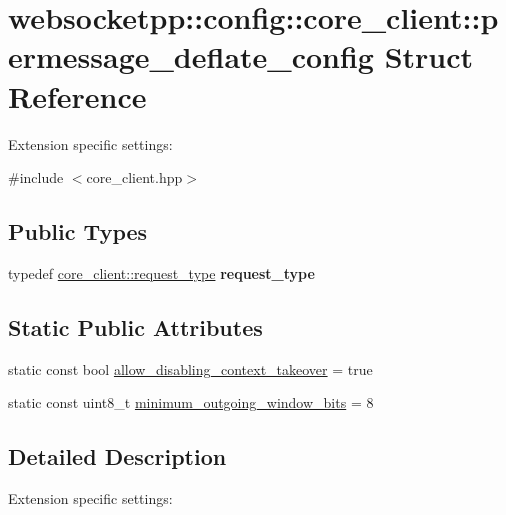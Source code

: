 \hypertarget{structwebsocketpp_1_1config_1_1core__client_1_1permessage__deflate__config}{}\section{websocketpp\+:\+:config\+:\+:core\+\_\+client\+:\+:permessage\+\_\+deflate\+\_\+config Struct Reference}
\label{structwebsocketpp_1_1config_1_1core__client_1_1permessage__deflate__config}


Extension specific settings\+:  




{\ttfamily \#include $<$core\+\_\+client.\+hpp$>$}

\subsection*{Public Types}
\begin{DoxyCompactItemize}
\item 
typedef \hyperlink{classwebsocketpp_1_1http_1_1parser_1_1request}{core\+\_\+client\+::request\+\_\+type} {\bfseries request\+\_\+type}\hypertarget{structwebsocketpp_1_1config_1_1core__client_1_1permessage__deflate__config_ad232507a23e7a2c6c70ae631dc87b80d}{}\label{structwebsocketpp_1_1config_1_1core__client_1_1permessage__deflate__config_ad232507a23e7a2c6c70ae631dc87b80d}

\end{DoxyCompactItemize}
\subsection*{Static Public Attributes}
\begin{DoxyCompactItemize}
\item 
static const bool \hyperlink{structwebsocketpp_1_1config_1_1core__client_1_1permessage__deflate__config_ab7cbd54d076521a3edf75bb44144d676}{allow\+\_\+disabling\+\_\+context\+\_\+takeover} = true
\item 
static const uint8\+\_\+t \hyperlink{structwebsocketpp_1_1config_1_1core__client_1_1permessage__deflate__config_a0ac8d0ba3a5fcc0220cd282b2e18242c}{minimum\+\_\+outgoing\+\_\+window\+\_\+bits} = 8
\end{DoxyCompactItemize}


\subsection{Detailed Description}
Extension specific settings\+: 

